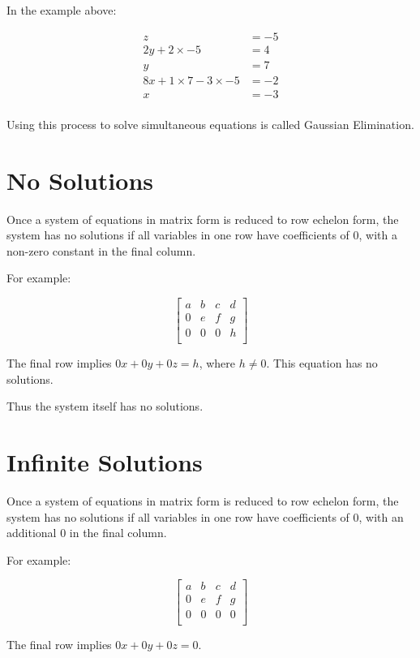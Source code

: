 \documentclass[a4paper,11pt]{report}
\begin{document}
In the example above:

$$
\begin{aligned}
z & = -5 \\
2y + 2 \times -5 & = 4 \\
y & = 7 \\
8x + 1 \times 7 - 3 \times -5 & = -2 \\
x & = -3 \\
\end{aligned}
$$

Using this process to solve simultaneous equations is called Gaussian
Elimination.


\section{No Solutions}

Once a system of equations in matrix form is reduced to row echelon form, the
system has no solutions if all variables in one row have coefficients of 0,
with a non-zero constant in the final column.

For example:

$$
\begin{bmatrix}
a & b & c & d \\
0 & e & f & g \\
0 & 0 & 0 & h \\
\end{bmatrix}
$$

The final row implies $0x + 0y + 0z = h$, where $h \neq 0$. This equation has
no solutions.

Thus the system itself has no solutions.


\section{Infinite Solutions}

Once a system of equations in matrix form is reduced to row echelon form, the
system has no solutions if all variables in one row have coefficients of 0,
with an additional 0 in the final column.

For example:

$$
\begin{bmatrix}
a & b & c & d \\
0 & e & f & g \\
0 & 0 & 0 & 0 \\
\end{bmatrix}
$$

The final row implies $0x + 0y + 0z = 0$.
\end{document}
